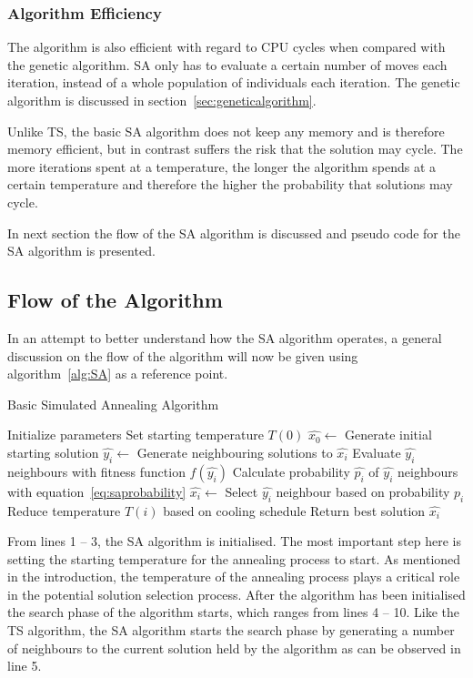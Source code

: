 \subsubsection{Algorithm Efficiency}
The algorithm is also efficient with regard to CPU cycles when compared with the genetic algorithm. \gls{SA} only has to evaluate a certain number of moves each iteration, instead of a whole population of individuals each iteration. The genetic algorithm is discussed in section~\ref{sec:geneticalgorithm}.

Unlike \gls{TS}, the basic \gls{SA} algorithm does not keep any memory and is therefore memory efficient, but in contrast suffers the risk that the solution may cycle. The more iterations spent at a temperature, the longer the algorithm spends at a certain temperature and therefore the higher the probability that solutions may cycle.

In next section the flow of the \gls{SA} algorithm is discussed and pseudo code for the \gls{SA} algorithm is presented.

\subsection{Flow of the Algorithm}
In an attempt to better understand how the \gls{SA} algorithm operates, a general discussion on the flow of the algorithm will now be given using algorithm~\ref{alg:SA} as a reference point.
\begin{algorithm}[H]
\caption{Basic Simulated Annealing Algorithm\cite{VeryFastSAImageEnchancement,ChaosSA}}
\label{alg:SA}
	\begin{algorithmic}[1]
		\State Initialize parameters
		\State Set starting temperature $T(0)$
    \State $\hat{x_0} \leftarrow$ Generate initial starting solution
    \State $\hat{y_i} \leftarrow$ Generate neighbouring solutions to $\hat{x_i}$
    \State Evaluate $\hat{y_i}$ neighbours with fitness function $f(\hat{y_i})$
    \State Calculate probability $\hat{p_i}$ of $\hat{y_i}$ neighbours with equation~\ref{eq:saprobability}
    \State $\hat{x_i} \leftarrow$ Select $\hat{y_i}$ neighbour based on probability $p_i$
			\State Reduce temperature $T(i)$ based on cooling schedule
		\EndWhile
    \State Return best solution $\hat{x_i}$
	\end{algorithmic}
\end{algorithm}

From lines 1 -- 3, the \gls{SA} algorithm is initialised. The most important step here is setting the starting temperature for the annealing process to start. As mentioned in the introduction, the temperature of the annealing process plays a critical role in the potential solution selection process. After the algorithm has been initialised the search phase of the algorithm starts, which ranges from lines 4 -- 10. Like the \gls{TS} algorithm, the \gls{SA} algorithm starts the search phase by generating a number of neighbours to the current solution held by the algorithm as can be observed in line 5.

